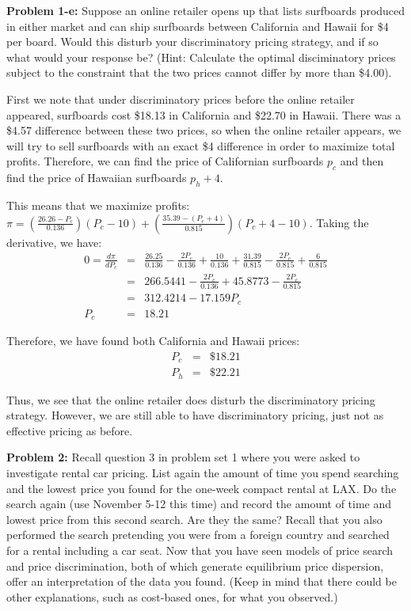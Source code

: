 \documentclass[psamsfonts]{amsart}
\newenvironment{sol}{\vspace{0.25cm}{\large \bfseries Solution:}}{\qedsymbol}
\newenvironment{prob}[1]{\begin{framed}{\large \bfseries Problem #1:}}{\end{framed}}
\begin{document}
\begin{prob}{1-e}
Suppose an online retailer opens up that lists surfboards produced in either market and can ship surfboards between California and Hawaii for \$4 per board.  Would this disturb your discriminatory pricing strategy, and if so what would your response be? (Hint: Calculate the optimal disciminatory prices subject to the constraint that the two prices cannot differ by more than \$4.00).  
\end{prob}
\begin{sol}
First we note that under discriminatory prices before the online retailer appeared, surfboards cost \$18.13 in California and \$22.70 in Hawaii. There was a \$4.57 difference between these two prices, so when the online retailer appears, we will try to sell surfboards with an exact \$4 difference in order to maximize total profits. Therefore, we can find the price of Californian surfboards $p_c$ and then find the price of Hawaiian surfboards $p_h + 4$. 

This means that we maximize profits: $\pi = \left( \frac{26.26 - P_c}{0.136} \right) (P_c - 10) + \left( \frac{35.39 - (P_c +4)}{0.815} \right) (P_c + 4 - 10)$. Taking the derivative, we have:
\begin{eqnarray}
0 = \frac{d\pi}{d P_c} &=& \frac{26.25}{0.136} - \frac{2 P_c}{0.136} + \frac{10}{0.136} + \frac{31.39}{0.815} - \frac{2 P_c}{0.815} + \frac{6}{0.815} \\
&=& 266.5441 - \frac{2 P_c}{0.136} + 45.8773 - \frac{2 P_c}{0.815} \\
&=& 312.4214 - 17.159 P_c \\
P_c &=& 18.21
\end{eqnarray}

Therefore, we have found both California and Hawaii prices:
\begin{eqnarray}
P_c &=& \$ 18.21 \\
P_h &=& \$ 22.21 
\end{eqnarray}

Thus, we see that the online retailer does disturb the discriminatory pricing strategy. However, we are still able to have discriminatory pricing, just not as effective pricing as before.
\end{sol}

\begin{prob}{2}
Recall question 3 in problem set 1 where you were asked to investigate rental car pricing.  List again the amount of time you spend searching and the lowest price you found for the one-week compact rental at LAX.  Do the search again (use November 5-12 this time) and record the amount of time and lowest price from this second search.  Are they the same?  Recall that you also performed the search pretending you were from a foreign country and searched for a rental including a car seat.  Now that you have seen models of price search and price discrimination, both of which generate equilibrium price dispersion, offer an interpretation of the data you found.  (Keep in mind that there could be other explanations, such as cost-based ones, for what you observed.)  
\end{prob}
\end{document}

